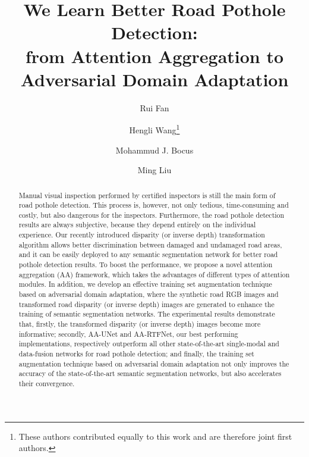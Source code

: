 \documentclass[runningheads]{llncs}
\begin{document}
\pagestyle{headings}\mainmatter{}

\title{We Learn Better Road Pothole Detection:\\from Attention Aggregation to\\ Adversarial Domain Adaptation}


\author{Rui Fan \and
    Hengli Wang\thanks{These authors contributed equally to this work and are therefore joint first authors.} \and
    Mohammud J. Bocus \and Ming Liu}

\maketitle

\begin{abstract}
Manual visual inspection performed by certified inspectors is still the main form of road pothole detection. This process is, however, not only tedious, time-consuming and costly, but also dangerous for the inspectors. Furthermore, the road pothole detection results are always subjective, because they depend entirely on the individual experience. Our recently introduced disparity (or inverse depth) transformation algorithm allows better discrimination between damaged and undamaged road areas, and it can be easily deployed to any semantic segmentation network for better road pothole detection results. To boost the performance, we propose a novel attention aggregation (AA) framework, which takes the advantages of different types of attention modules. In addition, we develop an effective training set augmentation technique based on adversarial domain adaptation, where the synthetic road RGB images and transformed road disparity (or inverse depth) images are generated to enhance the training of semantic segmentation networks. The experimental results demonstrate that, firstly, the transformed disparity (or inverse depth) images become more informative; secondly, AA-UNet and AA-RTFNet, our best performing implementations, respectively outperform all other state-of-the-art single-modal and data-fusion networks for road pothole detection; and finally, the training set augmentation technique based on adversarial domain adaptation not only improves the accuracy of the state-of-the-art semantic segmentation networks, but also accelerates their convergence.


\end{abstract}
\end{document}
